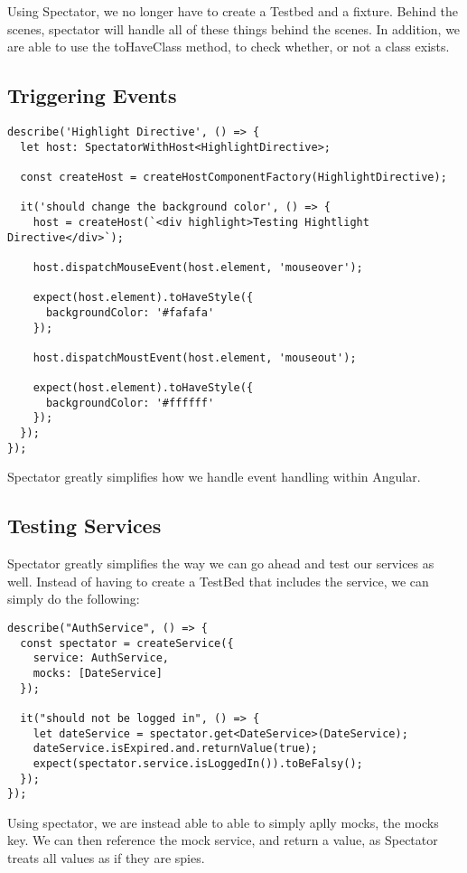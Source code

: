 Using Spectator, we no longer have to create a Testbed and a fixture. Behind
the scenes, spectator will handle all of these things behind the scenes. In
addition, we are able to use the toHaveClass method, to check whether, or not
a class exists.

\subsection{ Triggering Events }

\begin{lstlisting}
describe('Highlight Directive', () => {
  let host: SpectatorWithHost<HighlightDirective>;

  const createHost = createHostComponentFactory(HighlightDirective);

  it('should change the background color', () => {
    host = createHost(`<div highlight>Testing Hightlight Directive</div>`);

    host.dispatchMouseEvent(host.element, 'mouseover');

    expect(host.element).toHaveStyle({
      backgroundColor: '#fafafa'
    });

    host.dispatchMoustEvent(host.element, 'mouseout');

    expect(host.element).toHaveStyle({
      backgroundColor: '#ffffff'
    });
  });
});
\end{lstlisting}

Spectator greatly simplifies how we handle event handling within Angular.

\subsection{ Testing Services }
Spectator greatly simplifies the way we can go ahead and test our services as
well. Instead of having to create a TestBed that includes the service, we
can simply do the following:

\begin{lstlisting}
describe("AuthService", () => {
  const spectator = createService({
    service: AuthService,
    mocks: [DateService]
  });

  it("should not be logged in", () => {
    let dateService = spectator.get<DateService>(DateService);
    dateService.isExpired.and.returnValue(true);
    expect(spectator.service.isLoggedIn()).toBeFalsy();
  });
});
\end{lstlisting}

Using spectator, we are instead able to able to simply aplly mocks, the mocks
key. We can then reference the mock service, and return a value, as Spectator
treats all values as if they are spies.

